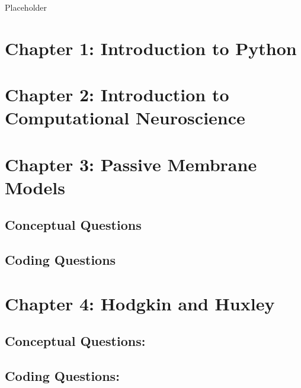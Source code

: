 \documentclass[
]{book}
\begin{document}
Placeholder

\hypertarget{chapter-1-introduction-to-python}{%
\section{Chapter 1: Introduction to Python}\label{chapter-1-introduction-to-python}}

\hypertarget{chapter-2-introduction-to-computational-neuroscience}{%
\section{Chapter 2: Introduction to Computational Neuroscience}\label{chapter-2-introduction-to-computational-neuroscience}}

\hypertarget{chapter-3-passive-membrane-models}{%
\section{Chapter 3: Passive Membrane Models}\label{chapter-3-passive-membrane-models}}

\hypertarget{conceptual-questions}{%
\subsection{Conceptual Questions}\label{conceptual-questions}}

\hypertarget{coding-questions}{%
\subsection{Coding Questions}\label{coding-questions}}

\hypertarget{chapter-4-hodgkin-and-huxley}{%
\section{Chapter 4: Hodgkin and Huxley}\label{chapter-4-hodgkin-and-huxley}}

\hypertarget{conceptual-questions-1}{%
\subsection{Conceptual Questions:}\label{conceptual-questions-1}}

\hypertarget{coding-questions-1}{%
\subsection{Coding Questions:}\label{coding-questions-1}}
\end{document}
